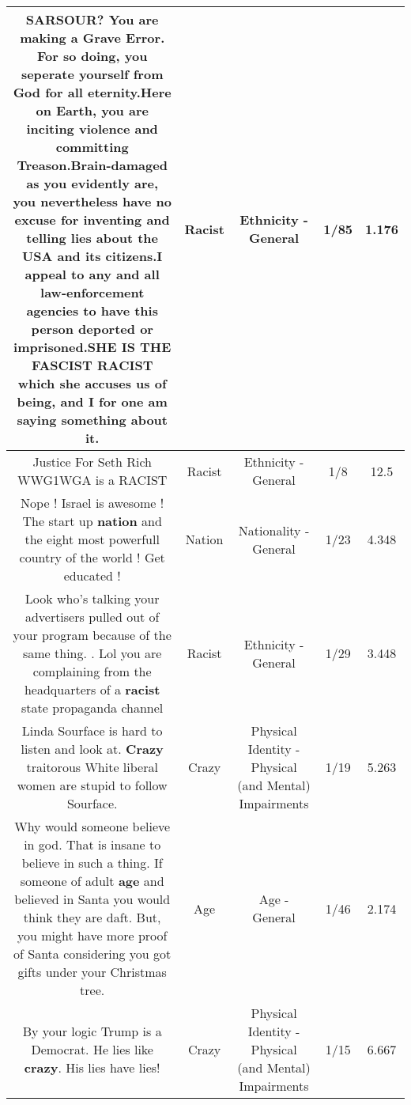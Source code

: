 \documentclass[11pt]{article}
\newlength\mylength
\begin{document}
\begin{center}
\begin{longtable}{|C{.65\mylength}|C{.30\mylength}|C{.12\mylength}|C{.12\mylength}|C{.12\mylength}|}
  \small SARSOUR? You are making a Grave Error. For so doing, you seperate yourself from God for all eternity.Here on Earth, you are inciting violence and committing Treason.Brain-damaged as you evidently are, you nevertheless have no excuse for inventing and telling lies about the USA and its citizens.I appeal to any and all law-enforcement agencies to have this person deported or imprisoned.SHE IS THE FASCIST  \textbf{RACIST} which she accuses us of being, and I for one am saying something about it.\normalsize   & Racist & Ethnicity - General & 1/85 & 1.176 \\  \hline
  \small Justice For Seth Rich WWG1WGA is a RACIST\normalsize   & Racist & Ethnicity - General & 1/8 & 12.5 \\  \hline
  \small Nope ! Israel is awesome ! The start up \textbf{nation} and the eight most powerfull country of the world ! Get educated !\normalsize   & Nation & Nationality - General & 1/23 & 4.348 \\  \hline
  \small Look who's talking  your advertisers  pulled out of your program because of the same thing. . Lol you are complaining from the headquarters of a \textbf{racist} state propaganda channel\normalsize   & Racist & Ethnicity - General & 1/29 & 3.448 \\  \hline
  \small Linda Sourface is hard to listen and look at. \textbf{Crazy} traitorous White liberal women are stupid to follow Sourface.\normalsize   & Crazy & Physical Identity - Physical (and Mental) Impairments & 1/19 & 5.263 \\  \hline
  \small Why would someone believe in god. That  is insane to believe in such a thing. If someone of adult \textbf{age} and believed in Santa you would think they are daft. But, you might have more proof of Santa considering you got gifts under your Christmas tree.\normalsize   & Age & Age - General & 1/46 & 2.174 \\  \hline
  \small By your logic Trump is a Democrat. He lies like \textbf{crazy}. His lies have lies!\normalsize   & Crazy & Physical Identity - Physical (and Mental) Impairments & 1/15 & 6.667 \\  \hline

\end{longtable}
\end{center}
\end{document}
